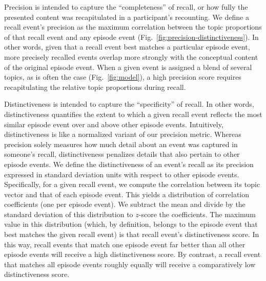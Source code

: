 \documentclass[10pt]{article}
\begin{document}
Precision is intended to capture the ``completeness'' of recall, or how fully the presented content was recapitulated in a participant's recounting.  We define a recall event's precision as the maximum correlation between the topic proportions of that recall event and any episode event (Fig.~\ref{fig:precision-distinctiveness}).  In other words, given that a recall event best matches a particular episode event, more precisely recalled events overlap more strongly with the conceptual content of the original episode event.  When a given event is assigned a blend of several topics, as is often the case (Fig.~\ref{fig:model}), a high precision score requires recapitulating the relative topic proportions during recall.

Distinctiveness is intended to capture the ``specificity'' of recall.  In other words, distinctiveness quantifies the extent to which a given recall event reflects the most similar episode event over and above other episode events.  Intuitively, distinctiveness is like a normalized variant of our precision metric.  Whereas precision solely measures how much detail about an event was captured in someone's recall, distinctiveness penalizes details that also pertain to other episode events.  We define the distinctiveness of an event's recall as its precision expressed in standard deviation units with respect to other episode events.  Specifically, for a given recall event, we compute the correlation between its topic vector and that of each episode event.  This yields a distribution of correlation coefficients (one per episode event).  We subtract the mean and divide by the standard deviation of this distribution to $z$-score the coefficients.  The maximum value in this distribution (which, by definition, belongs to the episode event that best matches the given recall event) is that recall event's distinctiveness score.  In this way, recall events that match one episode event far better than all other episode events will receive a high distinctiveness score.  By contrast, a recall event that matches all episode events roughly equally will receive a comparatively low distinctiveness score.
\end{document}
